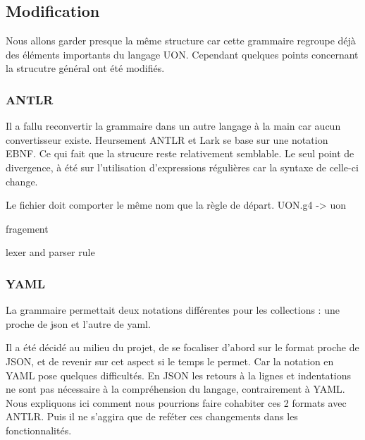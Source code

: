 \documentclass[
    iict, %
    il, %
]{heig-tb}
\begin{document}
\subsection{Modification}
Nous allons garder presque la même structure car cette grammaire regroupe déjà des éléments importants du langage UON.
Cependant quelques points concernant la strucutre général ont été modifiés.

\subsubsection{ANTLR}
Il a fallu reconvertir la grammaire dans un autre langage à la main car aucun convertisseur existe. Heursement ANTLR et Lark se base sur une notation EBNF.
Ce qui fait que la strucure reste relativement semblable.
Le seul point de divergence, à été sur l'utilisation d'expressions régulières car la syntaxe de celle-ci change.

Le fichier doit comporter le même nom que la règle de départ.
UON.g4 -> uon

fragement



lexer and parser rule

\subsubsection{YAML}
La grammaire permettait deux notations différentes pour les collections : une proche de json et l'autre de yaml.


Il a été décidé au milieu du projet, de se focaliser d'abord sur le format proche de JSON, et de revenir sur cet aspect si le temps le permet.
Car la notation en YAML pose quelques difficultés. %
En JSON les retours à la lignes et indentations ne sont pas nécessaire à la compréhension du langage, contrairement à YAML.
Nous expliquons ici comment nous pourrions faire cohabiter ces 2 formats avec ANTLR. %
Puis il ne s'aggira que de reféter ces changements dans les fonctionnalités. %
\end{document}
